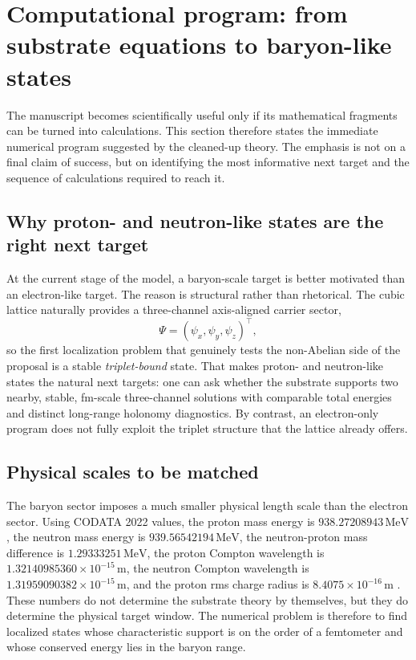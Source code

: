 \section{Computational program: from substrate equations to baryon-like states}
\label{sec:computational-program}

The manuscript becomes scientifically useful only if its mathematical fragments can be turned into calculations.
This section therefore states the immediate numerical program suggested by the cleaned-up theory.
The emphasis is not on a final claim of success, but on identifying the most informative next target and the sequence of calculations required to reach it.

\subsection{Why proton- and neutron-like states are the right next target}

At the current stage of the model, a baryon-scale target is better motivated than an electron-like target.
The reason is structural rather than rhetorical.
The cubic lattice naturally provides a three-channel axis-aligned carrier sector,
\begin{equation}
  \Psi=(\psi_x,\psi_y,\psi_z)^\top,
\end{equation}
so the first localization problem that genuinely tests the non-Abelian side of the proposal is a stable \emph{triplet-bound} state.
That makes proton- and neutron-like states the natural next targets:
one can ask whether the substrate supports two nearby, stable, fm-scale three-channel solutions with comparable total energies and distinct long-range holonomy diagnostics.
By contrast, an electron-only program does not fully exploit the triplet structure that the lattice already offers.

\subsection{Physical scales to be matched}

The baryon sector imposes a much smaller physical length scale than the electron sector.
Using CODATA 2022 values, the proton mass energy is $938.27208943\,\mathrm{MeV}$, the neutron mass energy is $939.56542194\,\mathrm{MeV}$, the neutron-proton mass difference is $1.29333251\,\mathrm{MeV}$, the proton Compton wavelength is $1.32140985360\times 10^{-15}\,\mathrm{m}$, the neutron Compton wavelength is $1.31959090382\times 10^{-15}\,\mathrm{m}$, and the proton rms charge radius is $8.4075\times 10^{-16}\,\mathrm{m}$ \citep{Mohr2025CODATA}.
These numbers do not determine the substrate theory by themselves, but they do determine the physical target window.
The numerical problem is therefore to find localized states whose characteristic support is on the order of a femtometer and whose conserved energy lies in the baryon range.

